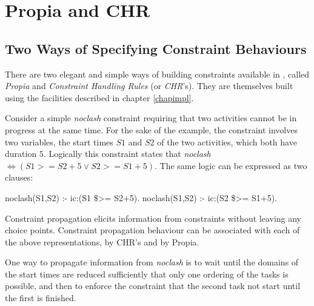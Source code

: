 %
% 
% 
% 
% 

\chapter{Propia and CHR}
\label{chappropiachr}

\section{Two Ways of Specifying Constraint Behaviours}
There are two elegant and simple ways of building constraints
available in \eclipse{}, called {\em Propia} and {\em Constraint
Handling Rules} (or {\em CHR}'s).  
They are themselves built using the facilities
described in chapter \ref{chapimpl}.

Consider a simple {\em noclash} constraint requiring that two
activities cannot be in progress at the same time.  
For the sake of the example, the constraint involves two variables,
the start times $S1$ and $S2$ 
of the two activities, which both have duration $5$.
Logically this constraint states that
{\em noclash} $ \Leftrightarrow (S1 >= S2 + 5 \vee S2 >= S1 + 5)$.
The same logic can be expressed as two \eclipse{} clauses:
\begin{code}
noclash(S1,S2) :-
    ic:(S1 \$>= S2+5).
noclash(S1,S2) :-
    ic:(S2 \$>= S1+5).
\end{code}
Constraint propagation elicits information from constraints without
leaving any choice points.  Constraint propagation behaviour can be
associated with each of the above representations, by CHR's
and by Propia.

One way to propagate information from {\em noclash} is to wait until
the domains of the start times are reduced sufficiently that only one
ordering of the tasks is possible, and then to enforce the constraint
that the second task not start until the first is finished.

